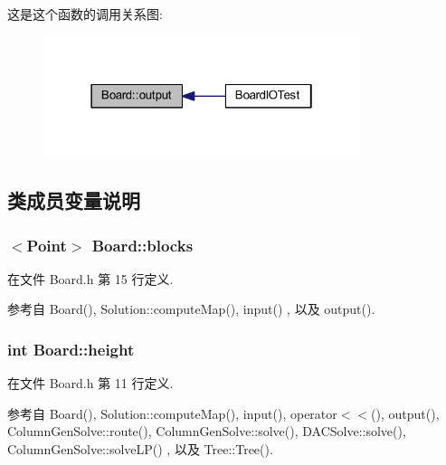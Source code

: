 这是这个函数的调用关系图\+:
\nopagebreak
\begin{figure}[H]
\begin{center}
\leavevmode
\includegraphics[width=262pt]{classBoard_a88190948cb3ed605cb54355de513cfa6_icgraph}
\end{center}
\end{figure}




\subsection{类成员变量说明}
\subsubsection[{\texorpdfstring{blocks}{blocks}}]{$<${\bf Point}$>$ Board\+::blocks}\hypertarget{classBoard_abd553dee0125b79f672dbfa74f86c52b}{}\label{classBoard_abd553dee0125b79f672dbfa74f86c52b}


在文件 Board.\+h 第 15 行定义.



参考自 Board(), Solution\+::compute\+Map(), input() , 以及 output().

\subsubsection[{\texorpdfstring{height}{height}}]{\setlength{\rightskip}{0pt plus 5cm}int Board\+::height}\hypertarget{classBoard_aa0cb8de0254520dc08dab5796643c8e5}{}\label{classBoard_aa0cb8de0254520dc08dab5796643c8e5}


在文件 Board.\+h 第 11 行定义.



参考自 Board(), Solution\+::compute\+Map(), input(), operator$<$$<$(), output(), Column\+Gen\+Solve\+::route(), Column\+Gen\+Solve\+::solve(), D\+A\+C\+Solve\+::solve(), Column\+Gen\+Solve\+::solve\+L\+P() , 以及 Tree\+::\+Tree().

